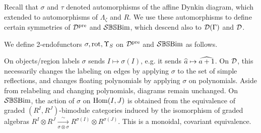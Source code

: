 

Recall that $\sigma$ and $\tau$ denoted automorphisms of the affine Dynkin diagram, which extended to automorphisms of $\Lambda_\zeta$ and $R$. 
We use these automorphisms to define certain symmetries of $\mathcal{D}^{\operatorname{pre}}$ and $\mathcal{S}\mathbb{BS}\text{Bim}$, which descend also to $\mathcal{D}(\Gamma)$ and $\mathcal{D}$.

\begin{defn} \label{defn:symmetries of diagsbs} 





We define 2-endofunctors $\sigma, \operatorname{rot}, \Upsilon_S$ on $\mathcal{D}^{\operatorname{pre}}$ and $\mathcal{S}\mathbb{BS}\text{Bim}$ as follows. 

On objects/region labels $\sigma$ sends $I \mapsto \sigma(I)$, e.g. it sends $\widehat{a} \mapsto \widehat{a+1}$. On $\mathcal{D}$, this necessarily changes the labeling on edges by applying $\sigma$ to the set of simple reflections, and changes floating polynomials by applying $\sigma$ on polynomials. 
Aside from relabeling and changing polynomials, diagrams remain unchanged. 
On $\mathcal{S}\mathbb{BS}\text{Bim}$, the action of $\sigma$ on $\operatorname{Hom}(I,J)$ is obtained from the equivalence of graded $(R^I,R^J)$-bimodule categories induced by the isomorphism of graded algebras $R^I\otimes R^J\xrightarrow[\sigma \otimes \sigma]{\sim}R^{\sigma(I)}\otimes R^{\sigma(J)}$.
This is a monoidal, covariant equivalence.


\end{defn}
